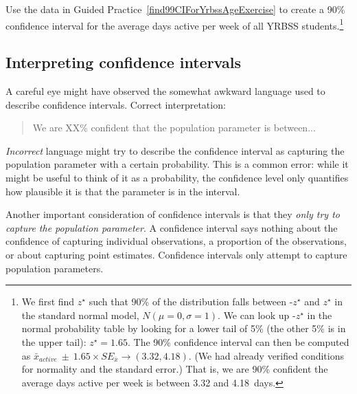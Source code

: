 \begin{exercise} \label{find90CIForYrbssAgeExercise}
Use the data in Guided Practice~\ref{find99CIForYrbssAgeExercise} to create a 90\% confidence interval for the average days active per week of all YRBSS students.\footnote{We first find $z^{\star}$ such that 90\% of the distribution falls between -$z^{\star}$ and $z^{\star}$ in the standard normal model, $N(\mu=0, \sigma=1)$. We can look up -$z^{\star}$ in the normal probability table by looking for a lower tail of 5\% (the other 5\% is in the upper tail): $z^{\star}=1.65$. The 90\% confidence interval can then be computed as $\bar{x}_{active}\ \pm\ 1.65\times SE_{\bar{x}} \to (3.32, 4.18)$. (We had already verified conditions for normality and the standard error.) That is, we are 90\% confident the average days active per week is between 3.32 and 4.18~days.}
\end{exercise}

\subsection{Interpreting confidence intervals}
\label{interpretingCIs}


A careful eye might have observed the somewhat awkward language used
to describe confidence intervals. Correct interpretation:
\begin{quote}
  We are XX\% confident that the population parameter is between...
\end{quote}
\emph{Incorrect} language might try to describe the confidence interval
as capturing the population parameter with a certain probability.
This is a common error: while it might be useful to think of it as
a probability, the confidence level only quantifies how plausible
it is that the parameter is in the interval.

Another important consideration of confidence intervals is that they
\emph{only try to capture the population parameter}. A confidence
interval says nothing about the confidence of capturing individual
observations, a proportion of the observations, or about capturing
point estimates. Confidence intervals only attempt to capture
population parameters.




























